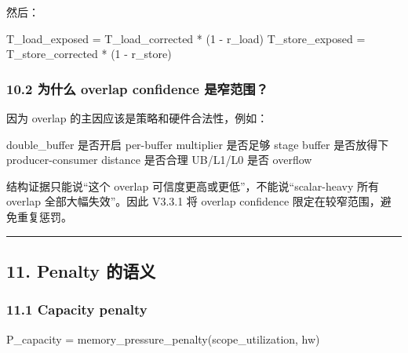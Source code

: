 \documentclass[
  10pt,
]{article}
\newenvironment{Shaded}{}{}
\newcommand{\NormalTok}[1]{#1}
\begin{document}
然后：

\begin{Shaded}
\begin{Highlighting}[]
\NormalTok{T\_load\_exposed  = T\_load\_corrected  * (1 {-} r\_load)}
\NormalTok{T\_store\_exposed = T\_store\_corrected * (1 {-} r\_store)}
\end{Highlighting}
\end{Shaded}

\subsubsection{10.2 为什么 overlap confidence
是窄范围？}\label{ux4e3aux4ec0ux4e48-overlap-confidence-ux662fux7a84ux8303ux56f4}

因为 overlap 的主因应该是策略和硬件合法性，例如：

\begin{Shaded}
\begin{Highlighting}[]
\NormalTok{double\_buffer 是否开启}
\NormalTok{per{-}buffer multiplier 是否足够}
\NormalTok{stage buffer 是否放得下}
\NormalTok{producer{-}consumer distance 是否合理}
\NormalTok{UB/L1/L0 是否 overflow}
\end{Highlighting}
\end{Shaded}

结构证据只能说``这个 overlap 可信度更高或更低''，不能说``scalar-heavy
所有 overlap 全部大幅失效''。因此 V3.3.1 将 overlap confidence
限定在较窄范围，避免重复惩罚。

\begin{center}\rule{0.5\linewidth}{0.5pt}\end{center}

\subsection{11. Penalty 的语义}\label{penalty-ux7684ux8bedux4e49}

\subsubsection{11.1 Capacity penalty}\label{capacity-penalty}

\begin{Shaded}
\begin{Highlighting}[]
\NormalTok{P\_capacity = memory\_pressure\_penalty(scope\_utilization, hw)}
\end{Highlighting}
\end{Shaded}
\end{document}
